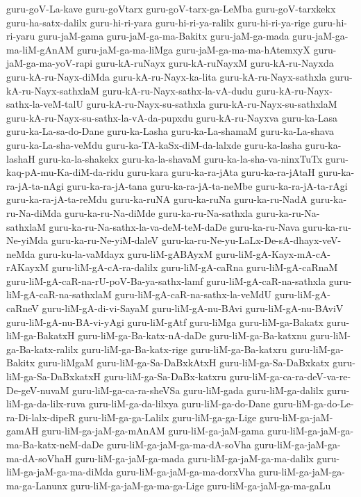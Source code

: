 {guru-goV-La-kave
guru-goVtarx
guru-goV-tarx-ga-LeMba
guru-goV-tarxkekx
guru-ha-satx-dalilx
guru-hi-ri-yara
guru-hi-ri-ya-ralilx
guru-hi-ri-ya-rige
guru-hi-ri-yaru
guru-jaM-gama
guru-jaM-ga-ma-Bakitx
guru-jaM-ga-mada
guru-jaM-ga-ma-liM-gAnAM
guru-jaM-ga-ma-liMga
guru-jaM-ga-ma-ma-hAtemxyX
guru-jaM-ga-ma-yoV-rapi
guru-kA-ruNayx
guru-kA-ruNayxM
guru-kA-ru-Nayxda
guru-kA-ru-Nayx-diMda
guru-kA-ru-Nayx-ka-lita
guru-kA-ru-Nayx-sathxla
guru-kA-ru-Nayx-sathxlaM
guru-kA-ru-Nayx-sathx-la-vA-dudu
guru-kA-ru-Nayx-sathx-la-veM-talU
guru-kA-ru-Nayx-su-sathxla
guru-kA-ru-Nayx-su-sathxlaM
guru-kA-ru-Nayx-su-sathx-la-vA-da-pupxdu
guru-kA-ru-Nayxva
guru-ka-Lasa
guru-ka-La-sa-do-Dane
guru-ka-Lasha
guru-ka-La-shamaM
guru-ka-La-shava
guru-ka-La-sha-veMdu
guru-ka-TA-kaSx-diM-da-lalxde
guru-ka-lasha
guru-ka-lashaH
guru-ka-la-shakekx
guru-ka-la-shavaM
guru-ka-la-sha-va-ninxTuTx
guru-kaq-pA-mu-Ka-diM-da-ridu
guru-kara
guru-ka-ra-jAta
guru-ka-ra-jAtaH
guru-ka-ra-jA-ta-nAgi
guru-ka-ra-jA-tana
guru-ka-ra-jA-ta-neMbe
guru-ka-ra-jA-ta-rAgi
guru-ka-ra-jA-ta-reMdu
guru-ka-ruNA
guru-ka-ruNa
guru-ka-ru-NadA
guru-ka-ru-Na-diMda
guru-ka-ru-Na-diMde
guru-ka-ru-Na-sathxla
guru-ka-ru-Na-sathxlaM
guru-ka-ru-Na-sathx-la-va-deM-teM-daDe
guru-ka-ru-Nava
guru-ka-ru-Ne-yiMda
guru-ka-ru-Ne-yiM-daleV
guru-ka-ru-Ne-yu-LaLx-De-sA-dhayx-veV-neMda
guru-ku-la-vaMdayx
guru-liM-gABAyxM
guru-liM-gA-Kayx-mA-cA-rAKayxM
guru-liM-gA-cA-ra-dalilx
guru-liM-gA-caRna
guru-liM-gA-caRnaM
guru-liM-gA-caR-na-rU-poV-Ba-ya-sathx-lamf
guru-liM-gA-caR-na-sathxla
guru-liM-gA-caR-na-sathxlaM
guru-liM-gA-caR-na-sathx-la-veMdU
guru-liM-gA-caRneV
guru-liM-gA-di-vi-SayaM
guru-liM-gA-nu-BAvi
guru-liM-gA-nu-BAviV
guru-liM-gA-nu-BA-vi-yAgi
guru-liM-gAtf
guru-liMga
guru-liM-ga-Bakatx
guru-liM-ga-BakatxH
guru-liM-ga-Ba-katx-nA-daDe
guru-liM-ga-Ba-katxnu
guru-liM-ga-Ba-katx-ralilx
guru-liM-ga-Ba-katx-rige
guru-liM-ga-Ba-katxru
guru-liM-ga-Bakitx
guru-liMgaM
guru-liM-ga-Sa-DaBxkAtxH
guru-liM-ga-Sa-DaBxkatx
guru-liM-ga-Sa-DaBxkatxH
guru-liM-ga-Sa-DaBx-katxru
guru-liM-ga-ca-ra-deV-va-re-De-geV-nuvaM
guru-liM-ga-ca-ra-sheVSa
guru-liM-gada
guru-liM-ga-dalilx
guru-liM-ga-da-lilx-ruva
guru-liM-ga-da-lilxya
guru-liM-ga-do-Dane
guru-liM-ga-do-Le-ra-Di-lalx-dipeR
guru-liM-ga-ga-Lalilx
guru-liM-ga-ga-Lige
guru-liM-ga-jaM-gamAH
guru-liM-ga-jaM-ga-mAnAM
guru-liM-ga-jaM-gama
guru-liM-ga-jaM-ga-ma-Ba-katx-neM-daDe
guru-liM-ga-jaM-ga-ma-dA-soVha
guru-liM-ga-jaM-ga-ma-dA-soVhaH
guru-liM-ga-jaM-ga-mada
guru-liM-ga-jaM-ga-ma-dalilx
guru-liM-ga-jaM-ga-ma-diMda
guru-liM-ga-jaM-ga-ma-dorxVha
guru-liM-ga-jaM-ga-ma-ga-Lanunx
guru-liM-ga-jaM-ga-ma-ga-Lige
guru-liM-ga-jaM-ga-ma-gaLu
}
